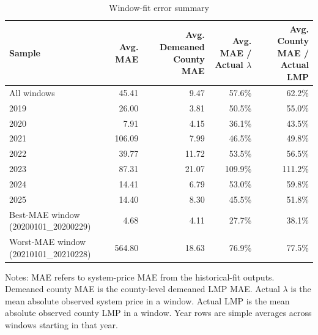 \begin{table}[htbp]
\centering
\caption{Window-fit error summary}
\label{tab:window-fit-error-summary}
\begin{tabular}{lrrrr}
\toprule
Sample & Avg. MAE & Avg. Demeaned County MAE & Avg. MAE / Actual $\lambda$ & Avg. County MAE / Actual LMP \\
\midrule
All windows & 45.41 & 9.47 & 57.6\% & 62.2\% \\
\midrule
2019 & 26.00 & 3.81 & 50.5\% & 55.0\% \\
2020 & 7.91 & 4.15 & 36.1\% & 43.5\% \\
2021 & 106.09 & 7.99 & 46.5\% & 49.8\% \\
2022 & 39.77 & 11.72 & 53.5\% & 56.5\% \\
2023 & 87.31 & 21.07 & 109.9\% & 111.2\% \\
2024 & 14.41 & 6.79 & 53.0\% & 59.8\% \\
2025 & 14.40 & 8.30 & 45.5\% & 51.8\% \\
\midrule
Best-MAE window (20200101_20200229) & 4.68 & 4.11 & 27.7\% & 38.1\% \\
Worst-MAE window (20210101_20210228) & 564.80 & 18.63 & 76.9\% & 77.5\% \\
\bottomrule
\end{tabular}
\vspace{0.5em}
\begin{minipage}{0.92\linewidth}
\footnotesize Notes: MAE refers to system-price MAE from the historical-fit outputs. Demeaned county MAE is the county-level demeaned LMP MAE. Actual $\lambda$ is the mean absolute observed system price in a window. Actual LMP is the mean absolute observed county LMP in a window. Year rows are simple averages across windows starting in that year.
\end{minipage}
\end{table}

